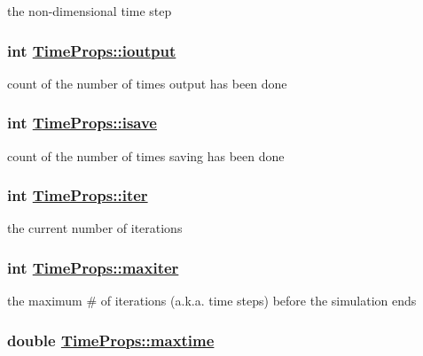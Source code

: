the non-dimensional time step 

\hypertarget{structTimeProps_o6}{
\subsubsection[ioutput]{\setlength{\rightskip}{0pt plus 5cm}int \hyperlink{structTimeProps_o6}{Time\-Props::ioutput}}}
\label{structTimeProps_o6}


count of the number of times output has been done 

\hypertarget{structTimeProps_o7}{
\subsubsection[isave]{\setlength{\rightskip}{0pt plus 5cm}int \hyperlink{structTimeProps_o7}{Time\-Props::isave}}}
\label{structTimeProps_o7}


count of the number of times saving has been done 

\hypertarget{structTimeProps_o1}{
\subsubsection[iter]{\setlength{\rightskip}{0pt plus 5cm}int \hyperlink{structTimeProps_o1}{Time\-Props::iter}}}
\label{structTimeProps_o1}


the current number of iterations 

\hypertarget{structTimeProps_o0}{
\subsubsection[maxiter]{\setlength{\rightskip}{0pt plus 5cm}int \hyperlink{structTimeProps_o0}{Time\-Props::maxiter}}}
\label{structTimeProps_o0}


the maximum \# of iterations (a.k.a. time steps) before the simulation ends 

\hypertarget{structTimeProps_o2}{
\subsubsection[maxtime]{\setlength{\rightskip}{0pt plus 5cm}double \hyperlink{structTimeProps_o2}{Time\-Props::maxtime}}}
\label{structTimeProps_o2}


